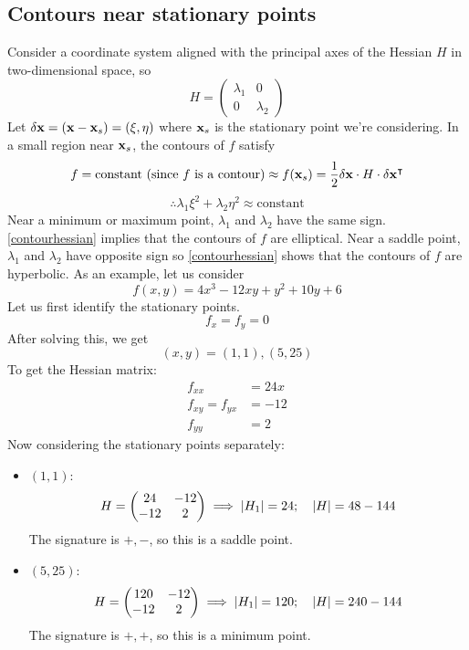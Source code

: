 \subsection{Contours near stationary points}
Consider a coordinate system aligned with the principal axes of the Hessian \(H\) in two-dimensional space, so
\[
	H = \begin{pmatrix}
		\lambda_1 & 0 \\ 0 & \lambda_2
	\end{pmatrix}
\]
Let \(\delta \vb x = (\vb x - \vb x_s) = (\xi, \eta)\) where \(\vb x_s\) is the stationary point we're considering.
In a small region near \(\vb x_s\), the contours of \(f\) satisfy
\[
	f = \text{constant (since \(f\) is a contour)} \approx f(\vb x_s) = \frac{1}{2}\delta \vb x \cdot H \cdot \delta \vb x^\intercal
\]
\begin{equation}\label{contourhessian}
	\therefore \lambda_1 \xi^2 + \lambda_2 \eta^2 \approx \text{constant}
\end{equation}
Near a minimum or maximum point, \(\lambda_1\) and \(\lambda_2\) have the same sign.
\eqref{contourhessian} implies that the contours of \(f\) are elliptical.
Near a saddle point, \(\lambda_1\) and \(\lambda_2\) have opposite sign so \eqref{contourhessian} shows that the contours of \(f\) are hyperbolic.
As an example, let us consider
\[
	f(x,y) = 4x^3 - 12xy + y^2 + 10y + 6
\]
Let us first identify the stationary points.
\[
	f_x = f_y = 0
\]
After solving this, we get
\[
	(x,y) = (1, 1), (5, 25)
\]
To get the Hessian matrix:
\begin{align*}
	f_{xx}          & = 24x \\
	f_{xy} = f_{yx} & = -12 \\
	f_{yy}          & = 2
\end{align*}
Now considering the stationary points separately:
\begin{itemize}
	\item \((1, 1)\):
	      \[
		      H = \begin{pmatrix}
			      24 & -12 \\ -12 & 2
		      \end{pmatrix} \implies \abs{H_1} = 24;\quad \abs{H} = 48-144
	      \]
	      The signature is \(+, -\), so this is a saddle point.
	\item \((5, 25)\):
	      \[
		      H = \begin{pmatrix}
			      120 & -12 \\ -12 & 2
		      \end{pmatrix} \implies \abs{H_1} = 120;\quad \abs{H} = 240-144
	      \]
	      The signature is \(+, +\), so this is a minimum point.
\end{itemize}
